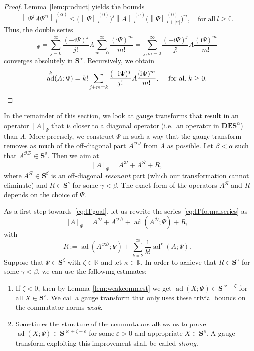 \documentclass[AHL,Unicode,longabstracts,published]{cedram}
\DeclareMathOperator{\ad}{ad}
\newcommand{\rmi}{\mathrm{i}}
\newcommand{\R}{\mathbb R}
\newcommand{\CD}{\mathcal{D}}
\newcommand{\CO}{\mathcal{O}}
\newcommand{\CR}{\mathcal{R}}
\newcommand{\COD}{{\CO\CD}}
\newcommand{\BD}{\mathbf D}
\newcommand{\BE}{\mathbf E}
\newcommand{\BS}{\mathbf S}
\newcommand{\snorm}[3]{\left\| #1\right\|_{#3}^{(#2)}}
\begin{document}
\begin{proof}
Lemma~\ref{lem:product} yields the bounds
\begin{equation}
\snorm{\Psi^jA\Psi^m}{\alpha}{l}\leq \big(\snorm{\Psi}{0}{l}\big)^j\snorm{A}{\alpha}{l}\big(\snorm{\Psi}{0}{l+|\alpha|}\big)^m, \quad \text{for all}\ l\geq 0.
\end{equation}
Thus, the double series
\begin{equation}
[A]_\Psi=\sum_{j= 0}^\infty \frac{(-\rmi \Psi)^j}{j!} A \sum_{m =0}^\infty \frac{(\rmi \Psi)^m}{m!} = \sum_{j,m= 0}^\infty \frac{(-\rmi \Psi)^j}{j!} A \frac{(\rmi \Psi)^m}{m!}
\end{equation}
converges absolutely in $\BS^\alpha$. Recursively, we obtain
\begin{equation}
\ad^k(A;\Psi) = k! \sum_{j + m = k} \frac{(-\rmi \Psi)^j}{j!} A \frac{(\rmi \Psi)^m}{m!}, \quad\text{ for all $k \ge 0$}.\qedhere
\end{equation}
\end{proof}

In the remainder of this section, we look at gauge transforms that result in an operator $[A]_\Psi$ that is closer to a diagonal operator (i.e.~an operator in $\BD\BE\BS^\alpha$) than $A$. More precisely, we construct $\Psi$ in such a way that the gauge transform removes as much of the off-diagonal part $A^{\CO\CD}$ from $A$ as possible. Let $\beta<\alpha$ such that $A^\COD\in\BS^\beta$. Then we aim at
\begin{equation}\label{eq:H'goal}
[A]_\Psi=A^\CD + A^\CR + R,
\end{equation}
where $A^\CR\in\BS^\beta$ is an off-diagonal
\emph{resonant} part (which our transformation cannot eliminate) and $R\in\BS^\gamma$ for some $\gamma <\beta$. The exact form of the operators $A^\CR$ and $R$ depends on the choice of $\Psi$.

As a first step towards~\eqref{eq:H'goal}, let us rewrite the series~\eqref{eq:H'formalseries} as
\begin{equation}\label{eq:firstorder}
[A]_\Psi = A^\CD + A^{\CO\CD} + \ad\left(A^\CD;\Psi\right) + R,
\end{equation}
with
\begin{equation}\label{eq:defRconsecgauge}
R:=\ad(A^{\CO\CD};\Psi)+\sum\limits_{k= 2}^\infty\frac{1}{k!}\ad^k(A;\Psi).
\end{equation}
Suppose that $\Psi \in \BS^\zeta$ with $\zeta \in \R$ and let $\kappa \in \R$. In order to achieve that $R\in\BS^\gamma$ for some $\gamma<\beta$, we can use the following estimates:
\begin{enumerate}
\item If $\zeta <0$, then by Lemma~\ref{lem:weakcommest} we get $\ad(X;\Psi)\in\BS^{\varkappa +\zeta}$ for all $X \in \BS^\varkappa$. We call a gauge transform that only uses these trivial bounds on the commutator norms \emph{weak}.
\item Sometimes the structure of the commutators allows us to prove $\ad(X;\Psi)\in\BS^{\varkappa +\zeta -\varepsilon}$ for some $\varepsilon >0$ and appropriate $X \in \BS^\varkappa$. A gauge transform exploiting this improvement shall be called \emph{strong}.
\end{enumerate}
\end{document}
